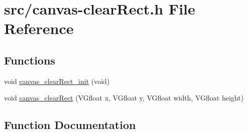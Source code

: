 \hypertarget{canvas-clearRect_8h}{}\section{src/canvas-\/clear\+Rect.h File Reference}
\label{canvas-clearRect_8h}
\subsection*{Functions}
\begin{DoxyCompactItemize}
\item 
void \hyperlink{canvas-clearRect_8h_a035739841862c79770e921d78d132364}{canvas\+\_\+clear\+Rect\+\_\+init} (void)
\item 
void \hyperlink{canvas-clearRect_8h_a73f7ee53af695ef904c3033f8f7601af}{canvas\+\_\+clear\+Rect} (V\+Gfloat x, V\+Gfloat y, V\+Gfloat width, V\+Gfloat height)
\end{DoxyCompactItemize}


\subsection{Function Documentation}
\hypertarget{canvas-clearRect_8h_a73f7ee53af695ef904c3033f8f7601af}{}
